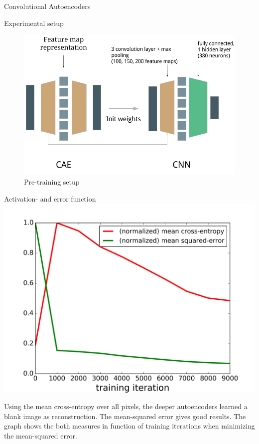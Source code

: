 \documentclass[final]{beamer}
\newlength{\onecolwid}
\begin{document}
\begin{frame}[t]
\begin{columns}[t]
\begin{column}{\onecolwid}
\begin{block}{Convolutional Autoencoders}
\end{block}


\begin{block}{Experimental setup}

\begin{figure}
\includegraphics[width=\linewidth]{graphics/setup.png}
\caption{Pre-training setup}
\end{figure}

\end{block}


\begin{block}{Activation- and error function}
	\centering
	\includegraphics[width=.7\linewidth]{graphics/mse_ce_comparison.png}

	Using the mean cross-entropy over all pixels, the deeper autoencoders learned a blank image as reconstruction. The mean-squared error gives good results. The graph shows the both measures in function of training iterations when minimizing the mean-squared error. 


\end{block}
\end{column}
\end{columns}
\end{frame}
\end{document}
